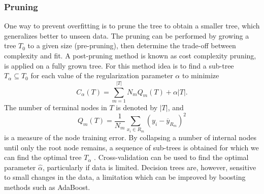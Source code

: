 \subsubsection{Pruning}\label{sssec:pruning}
One way to prevent overfitting is to prune the tree to obtain a smaller tree, which generalizes better to unseen data. The pruning can be performed by growing a tree $T_{0}$ to a given size (pre-pruning), then determine the trade-off between complexity and fit. A post-pruning method is known as cost complexity pruning, is applied on a fully grown tree. For this method idea is to find a sub-tree $T_{\alpha} \subseteq T_{0}$ for each value of the regularization parameter $\alpha$ to minimize 
\begin{equation}
    C_{\alpha} (T) = \sum_{m=1}^{|T|} N_{m} Q_{m}(T) + \alpha |T| .
\end{equation}
The number of terminal nodes in $T$ is denoted by $|T|$, and 
\begin{equation}
    Q_{m} (T) = \frac{1}{N_{m}}\sum_{x_{i} \in R_{m}} (y_{i} - \overline{y}_{R_{m}})^{2}  
\end{equation}
is a measure of the node training error. By collapsing a number of internal nodes until only the root node remains, a sequence of sub-trees is obtained for which we can find the optimal tree $T_{\alpha}$ \cite[p. 308]{hastie:2009:elements}. Cross-validation can be used to find the optimal parameter $\hat{\alpha}$, particularly if data is limited. Decision trees are, however, sensitive to small changes in the data, a limitation which can be improved by boosting methods such as AdaBoost.

